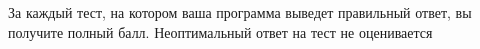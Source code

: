 За каждый тест, на котором ваша программа выведет правильный ответ, вы
получите полный балл. Неоптимальный ответ на тест не оценивается